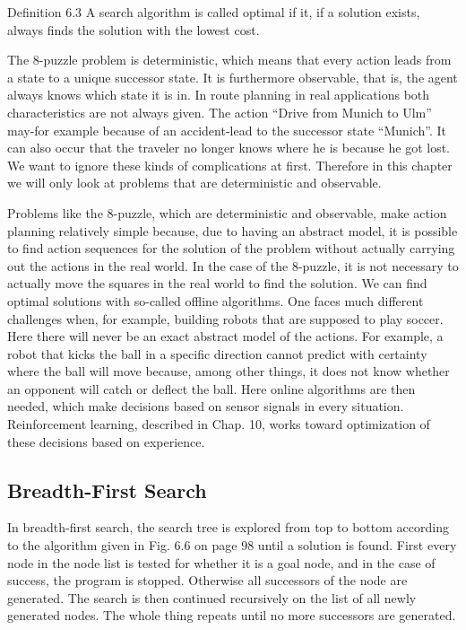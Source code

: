 \documentclass[10pt]{book}
\begin{document}
Definition 6.3 A search algorithm is called optimal if it, if a solution exists, always finds the solution with the lowest cost.

The 8-puzzle problem is deterministic, which means that every action leads from a state to a unique successor state. It is furthermore observable, that is, the agent always knows which state it is in. In route planning in real applications both characteristics are not always given. The action ``Drive from Munich to Ulm'' may-for example because of an accident-lead to the successor state ``Munich''. It can also occur that the traveler no longer knows where he is because he got lost. We want to ignore these kinds of complications at first. Therefore in this chapter we will only look at problems that are deterministic and observable.

Problems like the 8-puzzle, which are deterministic and observable, make action planning relatively simple because, due to having an abstract model, it is possible to find action sequences for the solution of the problem without actually carrying out the actions in the real world. In the case of the 8-puzzle, it is not necessary to actually move the squares in the real world to find the solution. We can find optimal solutions with so-called offline algorithms. One faces much different challenges when, for example, building robots that are supposed to play soccer. Here there will never be an exact abstract model of the actions. For example, a robot that kicks the ball in a specific direction cannot predict with certainty where the ball will move because, among other things, it does not know whether an opponent will catch or deflect the ball. Here online algorithms are then needed, which make decisions based on sensor signals in every situation. Reinforcement learning, described in Chap. 10, works toward optimization of these decisions based on experience.

\subsection{Breadth-First Search}
In breadth-first search, the search tree is explored from top to bottom according to the algorithm given in Fig. 6.6 on page 98 until a solution is found. First every node in the node list is tested for whether it is a goal node, and in the case of success, the program is stopped. Otherwise all successors of the node are generated. The search is then continued recursively on the list of all newly generated nodes. The whole thing repeats until no more successors are generated.
\end{document}
